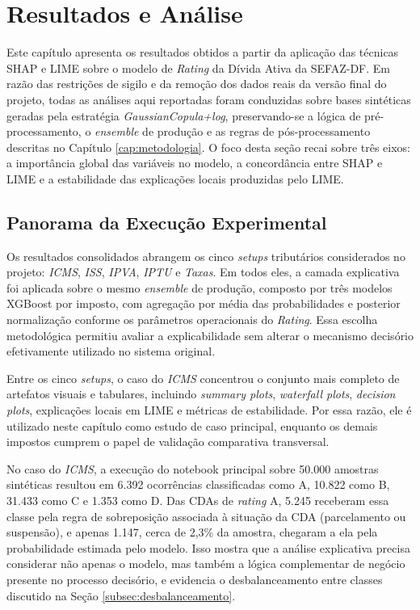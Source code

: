 \chapter{Resultados e Análise}
\label{cap:resultados_analise}

Este capítulo apresenta os resultados obtidos a partir da aplicação das técnicas SHAP e LIME sobre o modelo de \textit{Rating} da Dívida Ativa da SEFAZ-DF. Em razão das restrições de sigilo e da remoção dos dados reais da versão final do projeto, todas as análises aqui reportadas foram conduzidas sobre bases sintéticas geradas pela estratégia \textit{GaussianCopula+log}, preservando-se a lógica de pré-processamento, o \textit{ensemble} de produção e as regras de pós-processamento descritas no Capítulo \ref{cap:metodologia}. O foco desta seção recai sobre três eixos: a importância global das variáveis no modelo, a concordância entre SHAP e LIME e a estabilidade das explicações locais produzidas pelo LIME.

\section{Panorama da Execução Experimental}

Os resultados consolidados abrangem os cinco \textit{setups} tributários considerados no projeto: \textit{ICMS}, \textit{ISS}, \textit{IPVA}, \textit{IPTU} e \textit{Taxas}. Em todos eles, a camada explicativa foi aplicada sobre o mesmo \textit{ensemble} de produção, composto por três modelos XGBoost por imposto, com agregação por média das probabilidades e posterior normalização conforme os parâmetros operacionais do \textit{Rating}. Essa escolha metodológica permitiu avaliar a explicabilidade sem alterar o mecanismo decisório efetivamente utilizado no sistema original.

Entre os cinco \textit{setups}, o caso do \textit{ICMS} concentrou o conjunto mais completo de artefatos visuais e tabulares, incluindo \textit{summary plots}, \textit{waterfall plots}, \textit{decision plots}, explicações locais em LIME e métricas de estabilidade. Por essa razão, ele é utilizado neste capítulo como estudo de caso principal, enquanto os demais impostos cumprem o papel de validação comparativa transversal.

No caso do \textit{ICMS}, a execução do notebook principal sobre 50.000 amostras sintéticas resultou em 6.392 ocorrências classificadas como A, 10.822 como B, 31.433 como C e 1.353 como D. Das CDAs de \textit{rating} A, 5.245 receberam essa classe pela regra de sobreposição associada à situação da CDA (parcelamento ou suspensão), e apenas 1.147, cerca de 2,3\% da amostra, chegaram a ela pela probabilidade estimada pelo modelo. Isso mostra que a análise explicativa precisa considerar não apenas o modelo, mas também a lógica complementar de negócio presente no processo decisório, e evidencia o desbalanceamento entre classes discutido na Seção \ref{subsec:desbalanceamento}.

